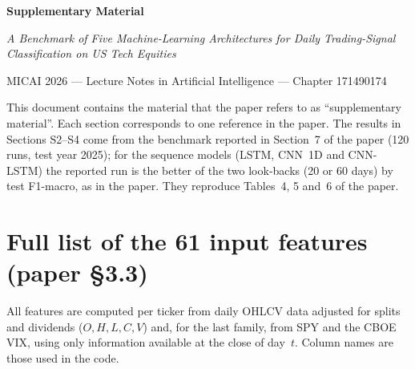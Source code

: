 \documentclass[10pt]{article}
\begin{document}
\begin{center}
{\Large\bfseries Supplementary Material\par}\vspace{4pt}
{\itshape A Benchmark of Five Machine-Learning Architectures for Daily Trading-Signal Classification on US Tech Equities\par}\vspace{3pt}
{\small MICAI 2026 --- Lecture Notes in Artificial Intelligence --- Chapter 171490174\par}
\end{center}
\vspace{4pt}

\noindent This document contains the material that the paper refers to as ``supplementary
material''. Each section corresponds to one reference in the paper. The results in Sections S2--S4
come from the benchmark reported in Section~7 of the paper (120 runs, test year 2025); for the sequence models
(LSTM, CNN~1D and CNN-LSTM) the reported run is the better of the two look-backs (20 or 60 days)
by test F1-macro, as in the paper. They reproduce Tables~4, 5 and~6 of the paper.

\section{Full list of the 61 input features (paper \S3.3)}
All features are computed per ticker from daily OHLCV data adjusted for splits and dividends
($O,H,L,C,V$) and, for the last family, from SPY and the CBOE VIX, using only information
available at the close of day~$t$. Column names are those used in the code.
\end{document}
